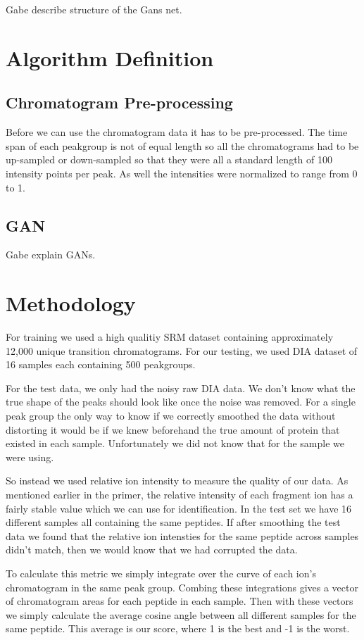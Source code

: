 \documentclass[12pt]{article}
\begin{document}
\color{red}
Gabe describe structure of the Gans net. 
\color{black}
\section{Algorithm Definition}
\subsection{Chromatogram Pre-processing}
Before we can use the chromatogram data it has to be pre-processed. The time span of each peakgroup is not of equal length so all the chromatograms had to be up-sampled or down-sampled so that they were all a standard length of 100 intensity points per peak. As well the intensities were normalized to range from 0 to 1.   
\subsection{GAN}
\color{red}
Gabe explain GANs.
\color{black}
\section{Methodology}
For training we used a high qualitiy SRM dataset\cite{Smooth_data} containing approximately 12,000 unique transition chromatograms. For our testing, we used DIA dataset \cite{TRIC} of 16 samples each containing 500 peakgroups.

For the test data, we only had the noisy raw DIA data. We don't know what the true shape of the peaks should look like once the noise was removed. For a single peak group the only way to know if we correctly smoothed the data without distorting it would be if we knew beforehand the true amount of protein that existed in each sample. Unfortunately we did not know that for the sample we were using. 

So instead we used relative ion intensity to measure the quality of our data. As mentioned earlier in the primer, the relative intensity of each fragment ion has a fairly stable value which we can use for identification. In the test set we have 16 different samples all containing the same peptides. If after smoothing the test data we found that the relative ion intensties for the same peptide across samples didn't match, then we would know that we had corrupted the data. 

To calculate this metric we simply integrate over the curve of each ion's chromatogram in the same peak group. Combing these integrations gives a vector of chromatogram areas for each peptide in each sample. Then with these vectors we simply calculate the average cosine angle between all different samples for the same peptide. This average is our score, where 1 is the best and -1 is the worst.
\end{document}
